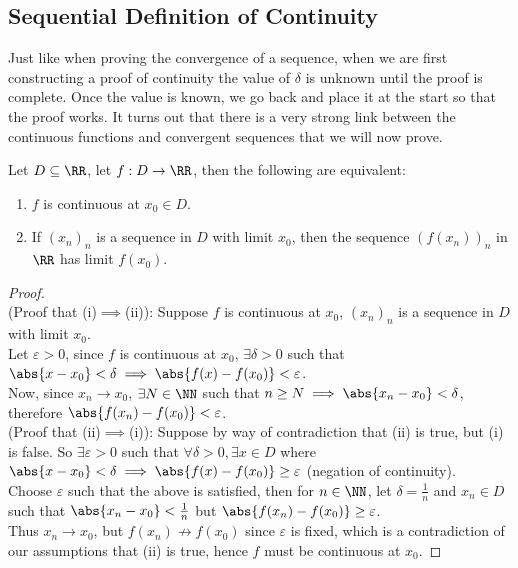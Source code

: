 \documentclass[../real_analysis.tex]{subfiles}
\begin{document}
        \subsection{Sequential Definition of Continuity}\label{subsec:sequential-definition-of-continuity}
            Just like when proving the convergence of a sequence, when we are first constructing a proof of continuity the value of $\delta$ is unknown until the proof is complete. Once the value is known, we go back and place it at the start so that the proof works.
            It turns out that there is a very strong link between the continuous functions and convergent sequences that we will now prove.
            \begin{theorem}\label{thm:seq-cont}
                Let $D\subseteq\RR$, let $f: D\to\RR$, then the following are equivalent:
                \begin{enumerate}[label={\upshape(\roman*)}]
                    \item $f$ is continuous at $x_0\in D$.
                    \item If $(x_n)_n$ is a sequence in $D$ with limit $x_0$, then the sequence $(f(x_n))_n$ in $\RR$ has limit $f(x_0)$.
                \end{enumerate}
            \end{theorem}
            \begin{proof}\\
                (Proof that (i)$\implies$(ii)): Suppose $f$ is continuous at $x_0$, $(x_n)_n$ is a sequence in $D$ with limit $x_0$.\\
                Let $\varepsilon>0$, since $f$ is continuous at $x_0$, $\exists\delta>0$ such that $\abs{x-x_0}<\delta\implies\abs{f(x)-f(x_0)}<\varepsilon$.\\
                Now, since $x_n\to x_0$, $\exists N\in\NN$ such that $n\geq N\implies\abs{x_n-x_0}<\delta$, therefore $\abs{f(x_n)-f(x_0)}<\varepsilon$.\\
                (Proof that (ii)$\implies$(i)): Suppose by way of contradiction that (ii) is true, but (i) is false. So $\exists\varepsilon>0$ such that $\forall\delta>0, \exists x\in D$ where $\abs{x-x_0}<\delta\implies\abs{f(x)-f(x_0)}\geq\varepsilon$ (negation of continuity).\\
                Choose $\varepsilon$ such that the above is satisfied, then for $n\in\NN$, let $\delta=\frac{1}{n}$ and $x_n\in D$ such that $\abs{x_n-x_0}<\frac{1}{n}$ but $\abs{f(x_n)-f(x_0)}\geq\varepsilon$.\\
                Thus $x_n\to x_0$, but $f(x_n)\not\to f(x_0)$ since $\varepsilon$ is fixed, which is a contradiction of our assumptions that (ii) is true, hence $f$ must be continuous at $x_0$.
            \end{proof}
\end{document}
